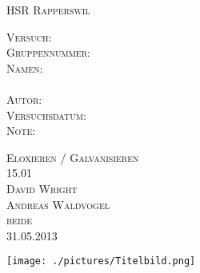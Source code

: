 

\begin{titlepage}
    \begin{center}
        \vspace*{\fill}
        
        \textsc{\LARGE HSR Rapperswil}\\[2cm]
        
        \begin{minipage}[t]{8cm}
            \textsc{\Large Versuch:}\\[0.5cm]
            \textsc{\Large Gruppennummer:}\\[0.5cm]
            \textsc{\Large Namen:}\\[0.5cm]
            \\[0.5cm]
            \textsc{\Large Autor:}\\[0.5cm]
            \textsc{\Large Versuchsdatum:}\\[0.5cm]
            \textsc{\Large Note:}
        \end{minipage}
        \begin{minipage}[t]{8cm}
            \textsc{\Large Eloxieren / Galvanisieren}\\[0.5cm]
            \textsc{\Large 15.01}\\[0.5cm]
            \textsc{\Large David Wright}\\[0.5cm]
            \textsc{\Large  Andreas Waldvogel}\\[0.5cm]
            \textsc{\Large beide}\\[0.5cm]
            \textsc{\Large 31.05.2013}
        \end{minipage}
        \vspace{2cm}
     
        \texttt{[image: ./pictures/Titelbild.png]}\\
        \vspace*{\fill}
        
        
        
        
        
    \end{center}
\end{titlepage}